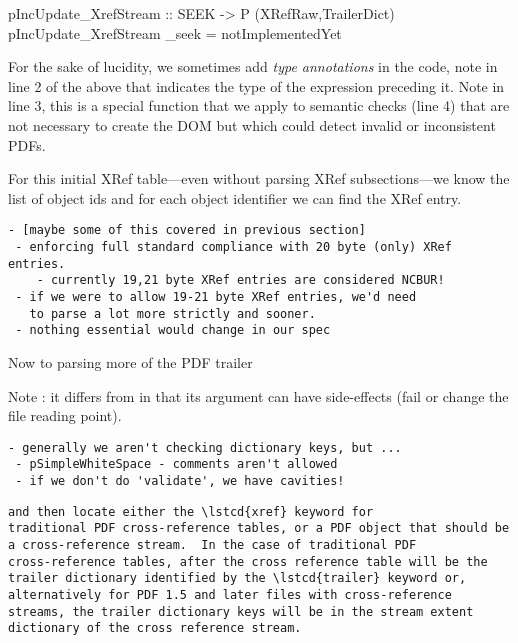 \begin{code}
pIncUpdate_XrefStream :: SEEK -> P (XRefRaw,TrailerDict)
pIncUpdate_XrefStream _seek = notImplementedYet
\end{code}

For the sake of lucidity, we sometimes add \emph{type annotations} in
the code, note in line 2 of the above that 
indicates the type of the expression preceding it.
%
Note  in line 3, this is a special function that we apply to
semantic checks (line 4) that are not necessary to create the DOM but which
could detect invalid or inconsistent PDFs.

For this initial XRef table---even without parsing XRef subsections---we
know the list of object ids and for each object identifier we can find the XRef entry.

\begin{lstlisting}[style=meta]
 - [maybe some of this covered in previous section]
 - enforcing full standard compliance with 20 byte (only) XRef entries.
    - currently 19,21 byte XRef entries are considered NCBUR!
 - if we were to allow 19-21 byte XRef entries, we'd need
   to parse a lot more strictly and sooner.
 - nothing essential would change in our spec
\end{lstlisting}


Now to parsing more of the PDF trailer
\begin{code}
\end{code}

Note : it differs from  in that
its argument can have side-effects (fail or change the file reading point).

\begin{lstlisting}[style=meta]
 - generally we aren't checking dictionary keys, but ...
 - pSimpleWhiteSpace - comments aren't allowed
 - if we don't do 'validate', we have cavities!
\end{lstlisting}


\begin{lstlisting}[style=meta]
and then locate either the \lstcd{xref} keyword for
traditional PDF cross-reference tables, or a PDF object that should be
a cross-reference stream.  In the case of traditional PDF
cross-reference tables, after the cross reference table will be the
trailer dictionary identified by the \lstcd{trailer} keyword or,
alternatively for PDF 1.5 and later files with cross-reference
streams, the trailer dictionary keys will be in the stream extent
dictionary of the cross reference stream.
\end{lstlisting}

